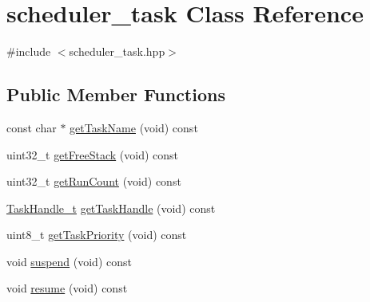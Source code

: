\hypertarget{classscheduler__task}{}\section{scheduler\+\_\+task Class Reference}
\label{classscheduler__task}


{\ttfamily \#include $<$scheduler\+\_\+task.\+hpp$>$}

\subsection*{Public Member Functions}
{\bf }\par
\begin{DoxyCompactItemize}
\item 
const char $\ast$ \hyperlink{classscheduler__task_a6d4dbf8fee1d9467f9f2b0e7b6927399}{get\+Task\+Name} (void) const 
\item 
uint32\+\_\+t \hyperlink{classscheduler__task_aa7102583062aa10d7d9ffea06724243f}{get\+Free\+Stack} (void) const 
\item 
uint32\+\_\+t \hyperlink{classscheduler__task_ab09e36827f63b02125597b18900b4655}{get\+Run\+Count} (void) const 
\item 
\hyperlink{task_8h_ae95f44d4cfeb4a599c6cc258d241cb6b}{Task\+Handle\+\_\+t} \hyperlink{classscheduler__task_af47a93a5021662b99a99132dee23b4ed}{get\+Task\+Handle} (void) const 
\item 
uint8\+\_\+t \hyperlink{classscheduler__task_ac693890966f3af1bf55ffabcbe0f7e2d}{get\+Task\+Priority} (void) const 
\end{DoxyCompactItemize}

{\bf }\par
\begin{DoxyCompactItemize}
\item 
void \hyperlink{classscheduler__task_a2c3631f16757154382a87629d72a87ce}{suspend} (void) const 
\item 
void \hyperlink{classscheduler__task_a03b3ac48b904f3b232838d3d014e0d52}{resume} (void) const 
\end{DoxyCompactItemize}

